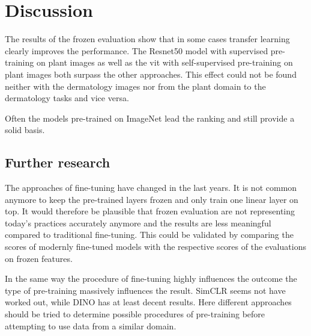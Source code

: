 \chapter{Discussion}\label{chapter_5}

The results of the frozen evaluation show that in some cases transfer learning clearly improves the performance.
The Resnet50 model with supervised pre-training on plant images as well as the \gls{vit} with self-supervised pre-training on plant images both surpass the other approaches.
This effect could not be found neither with the dermatology images nor from the plant domain to the dermatology tasks and vice versa.

Often the models pre-trained on ImageNet lead the ranking and still provide a solid basis.


\section{Further research}
The approaches of fine-tuning have changed in the last years. 
It is not common anymore to keep the pre-trained layers frozen and only train one linear layer on top. 
It would therefore be plausible that frozen evaluation are not representing today's practices accurately anymore and the results are less meaningful compared to traditional fine-tuning.
This could be validated by comparing the scores of modernly fine-tuned models with the respective scores of the evaluations on frozen features.

In the same way the procedure of fine-tuning highly influences the outcome the type of pre-training massively influences the result. 
SimCLR seems not have worked out, while DINO has at least decent results. 
Here different approaches should be tried to determine possible procedures of pre-training before attempting to use data from a similar domain.







